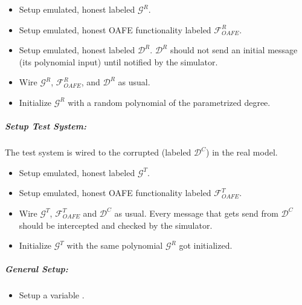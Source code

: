 \begin{itemize}

  \item Setup emulated, honest \JWpOne{} labeled $\mathcal{G}^R$.

  \item Setup emulated, honest OAFE functionality \JWfuncSymOAFE{}
    labeled $\mathcal{F}^R_{OAFE}$.

  \item Setup emulated, honest \JWpTwo{} labeled $\mathcal{D}^R$.
    $\mathcal{D}^R$ should not send an initial message (its polynomial input)
    until notified by the simulator.

  \item Wire $\mathcal{G}^R$, $\mathcal{F}^R_{OAFE}$, and $\mathcal{D}^R$ as
    usual.

  \item Initialize $\mathcal{G}^R$ with a random polynomial of the parametrized
    degree.

\end{itemize}


\subparagraph{Setup Test System:}

The test system is wired to the corrupted \JWpTwo{} (labeled $\mathcal{D}^C$) in
the real model.

\begin{itemize}

  \item Setup emulated, honest \JWpOne{} labeled $\mathcal{G}^T$.

  \item Setup emulated, honest OAFE functionality \JWfuncSymOAFE{}
    labeled $\mathcal{F}^T_{OAFE}$.

  \item Wire $\mathcal{G}^T$, $\mathcal{F}^T_{OAFE}$ and $\mathcal{D}^C$ as
    usual. Every message that gets send from $\mathcal{D}^C$ should be
    intercepted and checked by the simulator.

  \item Initialize $\mathcal{G}^T$ with the same polynomial $\mathcal{G}^R$ got
    initialized.

\end{itemize}


\subparagraph{General Setup:}

\begin{itemize}

  \item Setup a variable .

\end{itemize}


